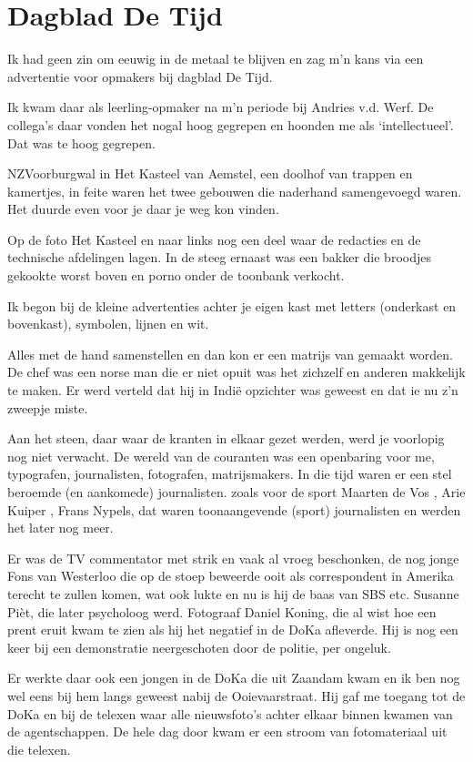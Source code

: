 \documentclass[10pt,twoside,openright]{memoir}
\begin{document}
\chapter{Dagblad De Tijd} %
\label{cha:detijd}

Ik had geen zin om eeuwig in de metaal te blijven en zag m’n kans via een advertentie voor opmakers bij dagblad De Tijd.

Ik kwam daar als leerling-opmaker na m’n periode bij Andries v.d. Werf. De collega’s daar vonden het nogal hoog gegrepen en hoonden me als ‘intellectueel’. Dat was te hoog gegrepen.

NZVoorburgwal in Het Kasteel van Aemstel, een doolhof van trappen en kamertjes, in feite waren het twee gebouwen die naderhand samengevoegd waren. Het duurde even voor je daar je weg kon vinden. 

Op de foto Het Kasteel en naar links nog een deel waar de redacties en de technische afdelingen lagen. In de steeg ernaast was een bakker die broodjes gekookte worst boven en porno onder de toonbank verkocht. 

Ik begon bij de kleine advertenties achter je eigen kast met letters (onderkast en bovenkast), symbolen, lijnen en wit.

Alles met de hand samenstellen en dan kon er een matrijs van gemaakt worden. De chef was een norse man die er niet opuit was het zichzelf en anderen makkelijk te maken. Er werd verteld dat hij in Indië opzichter was geweest en dat ie nu z'n zweepje miste.

Aan het steen, daar waar de kranten in elkaar gezet werden, werd je voorlopig nog niet verwacht. De wereld van de couranten was een openbaring voor me, typografen, journalisten, fotografen, matrijsmakers. In die tijd waren er een stel beroemde (en aankomede) journalisten. zoals voor de sport Maarten de Vos , Arie Kuiper , Frans Nypels, dat waren toonaangevende (sport) journalisten en werden het later nog meer. 

Er was de TV commentator met strik en vaak al vroeg beschonken, de nog jonge Fons van Westerloo die op de stoep beweerde ooit als correspondent in Amerika terecht te zullen komen, wat ook lukte en nu is hij de baas van SBS etc. Susanne Pièt, die later psycholoog werd. Fotograaf Daniel Koning, die al wist hoe een prent eruit kwam te zien als hij het negatief in de DoKa afleverde. Hij is nog een keer bij een demonstratie neergeschoten door de politie, per ongeluk. 

Er werkte daar ook een jongen in de DoKa die uit Zaandam kwam en ik ben nog wel eens bij hem langs geweest nabij de Ooievaarstraat. Hij gaf me toegang tot de DoKa en bij de telexen waar alle nieuwsfoto’s achter elkaar binnen kwamen van de agentschappen. De hele dag door kwam er een stroom van fotomateriaal uit die telexen. 
\end{document}

